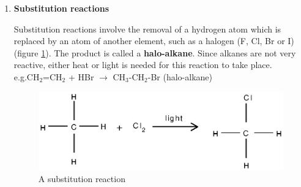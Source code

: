 \begin{enumerate}
\item{\textbf{Substitution reactions}

Substitution reactions involve the removal of a hydrogen atom which is replaced by an atom of another element, such as a halogen (F, Cl, Br or I) (figure \ref{fig:organic:substitution}). The product is called a \textbf{halo-alkane}. Since alkanes are not very reactive, either heat or light is needed for this reaction to take place.\\

e.g.\@ CH$_{2}$=CH$_{2}$ + HBr \rm${\rightarrow}$ CH$_{3}$-CH$_{2}$-Br (halo-alkane)

\begin{figure}[h]

\begin{center}
 \includegraphics{../../epsimages/substitution_rxn.eps}
\end{center}


\caption{A substitution reaction}
\label{fig:organic:substitution}
\end{figure}
}


\end{enumerate}
